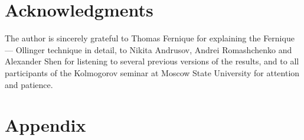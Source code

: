 \documentclass[12pt]{article}
\theoremstyle{remark}
\begin{document}
\section{Acknowledgments}

The author is sincerely grateful to Thomas Fernique for explaining the Fernique --- Ollinger technique in detail, 
to Nikita Andrusov, Andrei Romashchenko and Alexander Shen for listening to several previous versions of the results,
and to all participants of the Kolmogorov seminar at Moscow State University for attention and  patience.

\appendix
\section{Appendix}
\newcommand{\sector}{\text{sec}}
\newcommand{\angl}{\text{ang}}
\newcommand{\disc}{\text{disc}}
\end{document}
